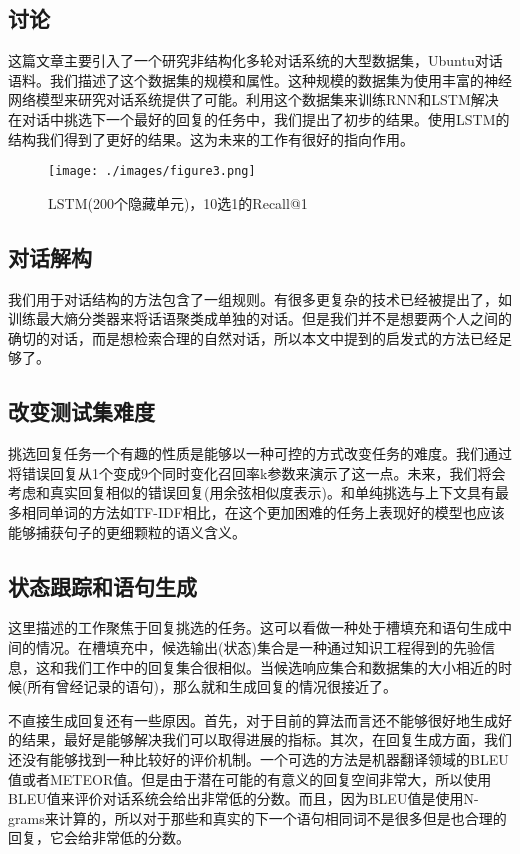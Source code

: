 \documentclass{article}
\begin{document}
\begin{multicols}{2}
	\section{讨论}
	这篇文章主要引入了一个研究非结构化多轮对话系统的大型数据集，Ubuntu对话语料。我们描述了这个数据集的规模和属性。这种规模的数据集为使用丰富的神经网络模型来研究对话系统提供了可能。利用这个数据集来训练RNN和LSTM解决在对话中挑选下一个最好的回复的任务中，我们提出了初步的结果。使用LSTM的结构我们得到了更好的结果。这为未来的工作有很好的指向作用。
	
	\begin{figure}[H]
		\centering
		\texttt{[image: ./images/figure3.png]}
		\caption{LSTM(200个隐藏单元)，10选1的Recall@1 }
		\label{LSTM性能提高}
	\end{figure}
	\subsection{对话解构}
	
	我们用于对话结构的方法包含了一组规则。有很多更复杂的技术已经被提出了，如训练最大熵分类器来将话语聚类成单独的对话。但是我们并不是想要两个人之间的确切的对话，而是想检索合理的自然对话，所以本文中提到的启发式的方法已经足够了。
	
	\subsection{改变测试集难度}
	挑选回复任务一个有趣的性质是能够以一种可控的方式改变任务的难度。我们通过将错误回复从1个变成9个同时变化召回率k参数来演示了这一点。未来，我们将会考虑和真实回复相似的错误回复(用余弦相似度表示)。和单纯挑选与上下文具有最多相同单词的方法如TF-IDF相比，在这个更加困难的任务上表现好的模型也应该能够捕获句子的更细颗粒的语义含义。
	
	\subsection{状态跟踪和语句生成}
	
	这里描述的工作聚焦于回复挑选的任务。这可以看做一种处于槽填充和语句生成中间的情况。在槽填充中，候选输出(状态)集合是一种通过知识工程得到的先验信息，这和我们工作中的回复集合很相似。当候选响应集合和数据集的大小相近的时候(所有曾经记录的语句)，那么就和生成回复的情况很接近了。
	
	不直接生成回复还有一些原因。首先，对于目前的算法而言还不能够很好地生成好的结果，最好是能够解决我们可以取得进展的指标。其次，在回复生成方面，我们还没有能够找到一种比较好的评价机制。一个可选的方法是机器翻译领域的BLEU值或者METEOR值。但是由于潜在可能的有意义的回复空间非常大，所以使用BLEU值来评价对话系统会给出非常低的分数。而且，因为BLEU值是使用N-grams来计算的，所以对于那些和真实的下一个语句相同词不是很多但是也合理的回复，它会给非常低的分数。
	

\end{multicols}
\end{document}
